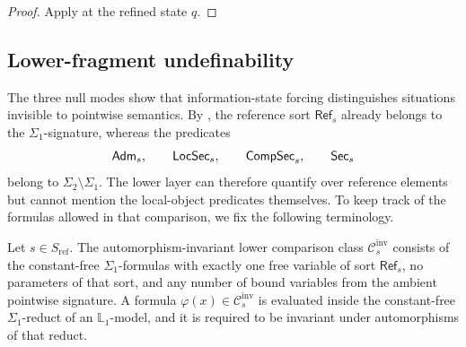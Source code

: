 \begin{proof}
Apply  at the refined state $q$.
\end{proof}

\subsection{Lower-fragment undefinability}

The three null modes show that information-state forcing distinguishes situations invisible to pointwise semantics. By , the reference sort $\mathsf{Ref}_s$ already belongs to the $\Sigma_1$-signature, whereas the predicates
\[
\mathsf{Adm}_s,\qquad \mathsf{LocSec}_s,\qquad \mathsf{CompSec}_s,\qquad \mathsf{Sec}_s
\]
belong to $\Sigma_2\setminus\Sigma_1$. The lower layer can therefore quantify over reference elements but cannot mention the local-object predicates themselves. To keep track of the formulas allowed in that comparison, we fix the following terminology.

\begin{definition}\label{def:lower-comparison-class}
Let $s\in S_{\mathrm{ref}}$. The automorphism-invariant lower comparison class $\mathcal{C}_{s}^{\mathrm{inv}}$ consists of the constant-free $\Sigma_1$-formulas with exactly one free variable of sort $\mathsf{Ref}_s$, no parameters of that sort, and any number of bound variables from the ambient pointwise signature. A formula $\varphi(x)\in\mathcal{C}_{s}^{\mathrm{inv}}$ is evaluated inside the constant-free $\Sigma_1$-reduct of an $\mathbb L_1$-model, and it is required to be invariant under automorphisms of that reduct.
\end{definition}

